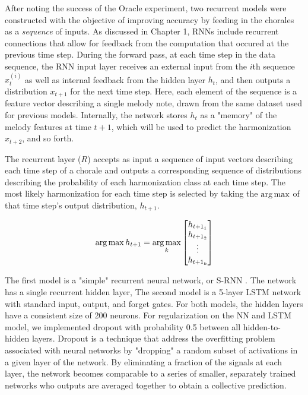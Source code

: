 \documentclass[11pt]{book}
\begin{document}
After noting the success of the Oracle experiment, two recurrent models were constructed with the objective of improving accuracy by feeding in the chorales as a \textit{sequence} of inputs. As discussed in Chapter 1, RNNs include recurrent connections that allow for feedback from the computation that occured at the previous time step. During the forward pass, at each time step in the data sequence, the RNN input layer receives an external input from the $i$th sequence $x^{(i)}_t$ as well as internal feedback from the hidden layer $h_{t}$, and then outputs a distribution $x_{t+1}$ for the next time step. Here, each element of the sequence is a feature vector describing a single melody note, drawn from the same dataset used for previous models. Internally, the network stores $h_t$ as a "memory" of the melody features at time $t + 1$, which will be used to predict the harmonization $x_{t+2}$, and so forth.

\begin{center}
\end{center}

The recurrent layer ($R$) accepts as input a sequence of input vectors describing each time step of a chorale and outputs a corresponding sequence of distributions describing the probability of each harmonization class at each time step. The most likely harmonization for each time step is selected by taking the $\argmax$ of that time step's output distribution, $h_{t+1}$.

$$\argmax h_{t+1} = \argmax_k
\begin{bmatrix} h_{{t+1}_1} \\ h_{{t+1}_2} \\ \vdots \\ h_{{t+1}_k}
 \end{bmatrix}
 $$

The first model is a "simple" recurrent neural network, or S-RNN \citep[p.~56]{goldberg2015nnlp}. The network has a single recurrent hidden layer, The second model is a 5-layer LSTM network with standard input, output, and forget gates. For both models, the hidden layers have a consistent size of 200 neurons. For regularization on the NN and LSTM model, we implemented dropout with probability 0.5 between all hidden-to-hidden layers. Dropout is a technique that address the overfitting problem associated with neural networks by "dropping" a random subset of activations in a given layer of the network. By eliminating a fraction of the signals at each layer, the network becomes comparable to a series of smaller, separately trained networks who outputs are averaged together to obtain a collective prediction.
\end{document}
